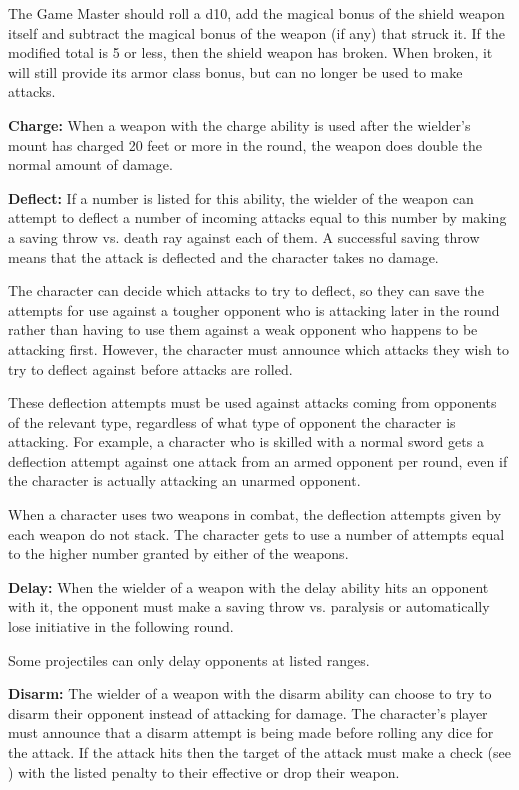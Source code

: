 \begin{multicols*}{2}
The Game Master should roll a d10, add the magical bonus of the shield weapon itself and subtract the magical bonus of the weapon (if any) that struck it. If the modified total is 5 or less, then the shield weapon has broken. When broken, it will still provide its armor class bonus, but can no longer be used to make attacks.

\textbf{Charge:} When a weapon with the charge ability is used after the wielder’s mount has charged 20 feet or more in the round, the weapon does double the normal amount of damage.

\textbf{Deflect:} If a number is listed for this ability, the wielder of the weapon can attempt to deflect a number of incoming attacks equal to this number by making a saving throw vs. death ray against each of them. A successful saving throw means that the attack is deflected and the character takes no damage.

The character can decide which attacks to try to deflect, so they can save the attempts for use against a tougher opponent who is attacking later in the round rather than having to use them against a weak opponent who happens to be attacking first. However, the character must announce which attacks they wish to try to deflect against before attacks are rolled.

These deflection attempts must be used against attacks coming from opponents of the relevant type, regardless of what type of opponent the character is attacking. For example, a character who is skilled with a normal sword gets a deflection attempt against one attack from an armed opponent per round, even if the character is actually attacking an unarmed opponent.

When a character uses two weapons in combat, the deflection attempts given by each weapon do not stack. The character gets to use a number of attempts equal to the higher number granted by either of the weapons.

\textbf{Delay:} When the wielder of a weapon with the delay ability hits an opponent with it, the opponent must make a saving throw vs. paralysis or automatically lose initiative in the following round.

Some projectiles can only delay opponents at listed ranges.

\textbf{Disarm:} The wielder of a weapon with the disarm ability can choose to try to disarm their opponent instead of attacking for damage. The character’s player must announce that a disarm attempt is being made before rolling any dice for the attack. If the attack hits then the target of the attack must make a  check (see ) with the listed penalty to their effective  or drop their weapon.


\end{multicols*}
